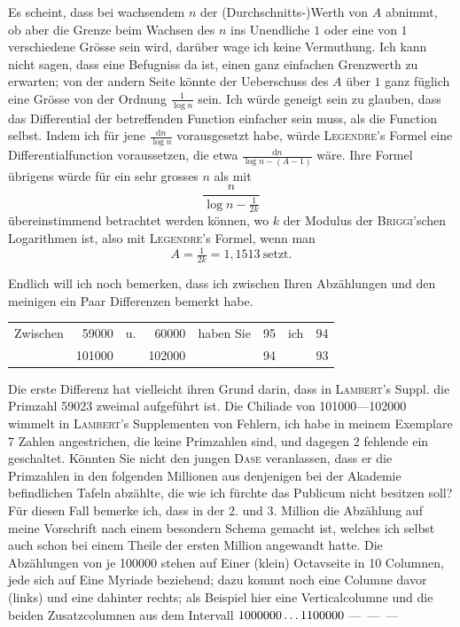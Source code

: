 Es scheint, dass bei wachsendem $n$ der (Durchschnitts-)Werth von $A$ abnimmt, ob aber die Grenze beim Wachsen des $n$ ins Unendliche $1$ oder eine von $1$ verschiedene Grösse sein wird, darüber wage ich keine Vermuthung. Ich kann nicht sagen, dass eine Befugniss da ist, einen ganz einfachen Grenzwerth zu erwarten; von der andern Seite könnte der Ueberschuss des $A$ über $1$ ganz füglich eine Grösse von der Ordnung $\frac{1}{\log n}$ sein. Ich würde geneigt sein zu glauben, dass das Differential der betreffenden Function einfacher sein muss, als die Function selbst. Indem ich für jene $\frac{\mathrm{d}n}{\log n}$ vorausgesetzt habe, würde \textsc{Legendre}’s Formel eine Differentialfunction voraussetzen, die etwa $\frac{\mathrm{d}n}{\log n-(A-1)}$ wäre. Ihre Formel übrigens würde für ein sehr grosses $n$ als mit
\[
\frac{n}{\log n-\frac{1}{2k}}
\]
übereinstimmend betrachtet werden können, wo $k$ der Modulus der \textsc{Brig\-gi}’schen Logarithmen ist, also mit \textsc{Legendre}’s Formel, wenn man
\[
A=\tfrac{1}{2k}=1{,}1513\ \text{setzt.}
\]

Endlich will ich noch bemerken, dass ich zwischen Ihren Abzählungen und den meinigen ein Paar Differenzen bemerkt habe.
\begin{center}
\begin{tabular}{lrlrlrlr}
Zwischen & 59000 & u. & 60000 & haben Sie & 95 & ich & 94\\
 & 101000 & & 102000 & & 94 & & 93
\end{tabular}
\end{center}
Die erste Differenz hat vielleicht ihren Grund darin, dass in \textsc{Lambert}’s Suppl. die Primzahl 59023 zweimal aufgeführt ist. Die Chiliade von 101000—102000 wimmelt in \textsc{Lambert}’s Supplementen von Fehlern, ich habe in meinem Exemplare 7 Zahlen angestrichen, die keine Primzahlen sind, und dagegen 2 fehlende ein%
%
geschaltet. Könnten Sie nicht den jungen \textsc{Dase} veranlassen, dass er die Primzahlen in den folgenden Millionen aus denjenigen bei der Akademie befindlichen Tafeln abzählte, die wie ich fürchte das Publicum nicht besitzen soll? Für diesen Fall bemerke ich, dass in der 2. und 3. Million die Abzählung auf meine Vorschrift nach einem besondern Schema gemacht ist, welches ich selbst auch schon bei einem Theile der ersten Million angewandt hatte. Die Abzählungen von je 100000 stehen auf Einer (klein) Octavseite in 10 Columnen, jede sich auf Eine Myriade beziehend; dazu kommt noch eine Columne davor (links) und eine dahinter rechts; als Beispiel hier eine Verticalcolumne und die beiden Zusatzcolumnen aus dem Intervall $1000000\mathinner{.\,.\,.}1100000$ \mbox{— — —}

